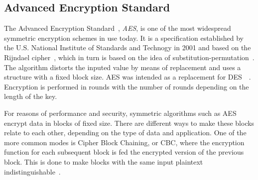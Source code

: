 \subsection{Advanced Encryption Standard}

The Advanced Encryption Standard~\cite{AES:2001}, \emph{AES}, is one of the most widespread symmetric encryption schemes in use today. It is a specification established by the U.S. National Institute of Standards and Technogy in 2001 and based on the Rijndael cipher~\cite{Rijndael:Online}, which in turn is based on the idea of substitution-permutation~\cite{AESISFAST:Online}. The algorithm distorts the inputed value by means of replacement and uses a structure with a fixed block size. AES was intended as a replacement for DES~\cite{DES:1977}~\cite{Cisco:2001}. Encryption is performed in rounds with the number of rounds depending on the length of the key.

For reasons of performance and security, symmetric algorithms such as AES encrypt data in blocks of fixed size. There are different ways to make these blocks relate to each other, depending on the type of data and application. One of the more common modes is Cipher Block Chaining, or CBC, where the encryption function for each subsequent block is fed the encrypted version of the previous block. This is done to make blocks with the same input plaintext indistinguishable~\cite{SearchSecurityCipherBlockChaining:Online}.
